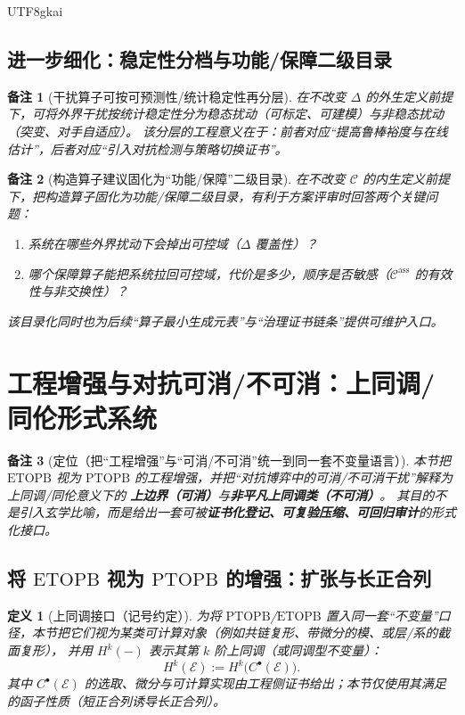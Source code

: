 \documentclass[12pt]{article}
\newtheorem{definition}{定义}[section]
\newtheorem{remark}{备注}[section]
\newcommand{\PTOPB}{\ensuremath{\mathrm{PTOPB}}}
\newcommand{\ETOPB}{\ensuremath{\mathrm{ETOPB}}}
\begin{document}
\begin{CJK*}{UTF8}{gkai}
\subsection{进一步细化：稳定性分档与功能/保障二级目录}
\label{sec:finer-taxonomy}

\begin{remark}[干扰算子可按可预测性/统计稳定性再分层]
在不改变 $\Delta$ 的外生定义前提下，可将外界干扰按统计稳定性分为稳态扰动（可标定、可建模）与非稳态扰动（突变、对手自适应）。
该分层的工程意义在于：前者对应“提高鲁棒裕度与在线估计”，后者对应“引入对抗检测与策略切换证书”。
\end{remark}

\begin{remark}[构造算子建议固化为“功能/保障”二级目录]
在不改变 $\mathcal{C}$ 的内生定义前提下，把构造算子固化为功能/保障二级目录，有利于方案评审时回答两个关键问题：
\begin{enumerate}
  \item 系统在哪些外界扰动下会掉出可控域（$\Delta$ 覆盖性）？
  \item 哪个保障算子能把系统拉回可控域，代价是多少，顺序是否敏感（$\mathcal{C}^{\mathrm{ass}}$ 的有效性与非交换性）？
\end{enumerate}
该目录化同时也为后续“算子最小生成元表”与“治理证书链条”提供可维护入口。
\end{remark}

\section{工程增强与对抗可消/不可消：上同调/同伦形式系统}
\label{sec:etopb-augmentation-cohomology-homotopy}

\begin{remark}[定位（把“工程增强”与“可消/不可消”统一到同一套不变量语言）]
本节把 \ETOPB{} 视为 \PTOPB{} 的工程增强，并把“对抗博弈中的可消/不可消干扰”解释为上同调/同伦意义下的
\textbf{上边界（可消）}与\textbf{非平凡上同调类（不可消）}。
其目的不是引入玄学比喻，而是给出一套可被\textbf{证书化登记、可复验压缩、可回归审计}的形式化接口。
\end{remark}

\subsection{将 \ETOPB{} 视为 \PTOPB{} 的增强：扩张与长正合列}
\label{sec:etopb-as-ptopb-augmentation}

\begin{definition}[上同调接口（记号约定）]
为将 \PTOPB/\ETOPB{} 置入同一套“不变量”口径，本节把它们视为某类可计算对象（例如共链复形、带微分的模、或层/系的截面复形），
并用 $H^k(-)$ 表示其第 $k$ 阶上同调（或同调型不变量）：
\[
  H^k(\mathcal{E})
  := H^k\bigl(C^\bullet(\mathcal{E})\bigr).
\]
其中 $C^\bullet(\mathcal{E})$ 的选取、微分与可计算实现由工程侧证书给出；本节仅使用其满足的函子性质（短正合列诱导长正合列）。
\end{definition}


\end{CJK*}
\end{document}
